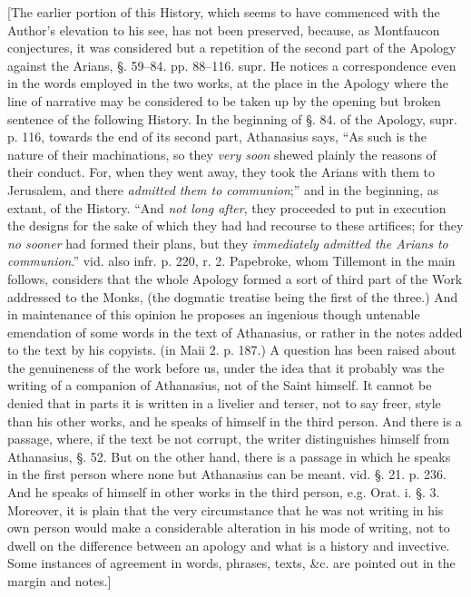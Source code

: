 [The earlier portion of this History, which seems
to have commenced with the Author's elevation to his see, has not been
preserved, because, as Montfaucon conjectures, it was considered but a
repetition of the second part of the Apology against the Arians, §.
59–84. pp. 88–116. supr. He notices a correspondence even in the
words employed in the two works, at the place in the Apology where the
line of narrative may be considered to be taken up by the opening but
broken sentence of the following History. In the beginning of §. 84.
of the Apology, supr. p. 116, towards the end of its second part,
Athanasius says, ``As such is the nature of their machinations, so they
\emph{very soon} shewed plainly the reasons of their conduct. For,
when they went away, they took the Arians with them to Jerusalem, and
there \emph{admitted them to communion};'' and in the beginning, as
extant, of the History. ``And \emph{not long after}, they proceeded to
put in execution the designs for the sake of which they had had
recourse to these artifices; for they \emph{no sooner} had formed
their plans, but they \emph{immediately admitted the Arians to communion}.''
vid. also infr. p. 220, r. 2. Papebroke, whom Tillemont in the main
follows, considers that the whole Apology formed a sort of third part
of the Work addressed to the Monks, (the dogmatic treatise being the
first of the three.) And in maintenance of this opinion he proposes an
ingenious though untenable emendation of some words in the text of
Athanasius, or rather in the notes added to the text by his copyists.
(in Maii 2. p. 187.) A question has been raised about the genuineness
of the work before us, under the idea that it probably was the writing
of a companion of Athanasius, not of the Saint himself. It cannot be
denied that in parts it is written in a livelier and terser, not to
say freer, style than his other works, and he speaks of himself in the
third person. And there is a passage, where, if the text be not
corrupt, the writer distinguishes himself from Athanasius, §. 52. But
on the other hand, there is a passage in which he speaks in the first
person where none but Athanasius can be meant. vid. §. 21. p. 236.
And he speaks of himself in other works in the third person, e.g. Orat.
i. §. 3. Moreover, it is plain that the very circumstance that he was
not writing in his own person would make a considerable alteration in
his mode of writing, not to dwell on the difference between an apology
and what is a history and invective. Some instances of agreement in
words, phrases, texts, \&c. are pointed out in the margin and
notes.]

